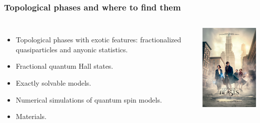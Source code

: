 \documentclass[xcolor=table, 10pt, aspectratio=43]{beamer}
\begin{document}
\begin{frame}
  \frametitle{Topological phases and where to find them}
  \begin{columns}
  \begin{itemize}
    \item<1-2> Topological phases with exotic features: fractionalized quasiparticles and anyonic statistics.
    \item<1-2> Fractional quantum Hall states.
    \item<1-2> Exactly solvable models.
    \item<1> Numerical simulations of quantum spin models.
    \item<1> Materials.
  \end{itemize}
  \begin{center}
    \includegraphics[width=4.5cm]{../resources/fbeasts}
  \end{center}
  \end{columns}
\end{frame}
\end{document}
